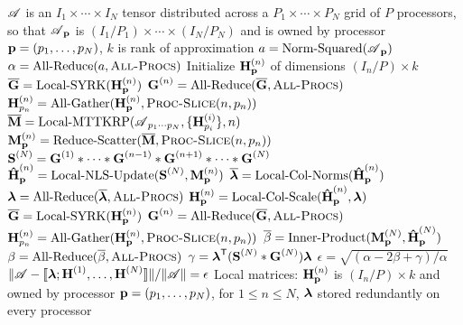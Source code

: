 \begin{algorithm}
\caption{$(\CPl,\epsilon) = \text{Par-NNCP}(\TA,k)$}
\label{alg:2D}
\begin{algorithmic}[1]
\Require $\TA$ is an $I_1\times \cdots \times I_N$ tensor distributed across a $P_1\times \cdots \times P_N$ grid of $P$ processors, so that $\TA_{\V{p}}$ is $(I_1/P_1)\times \cdots \times (I_N/P_N)$ and is owned by processor $\V{p}=(p_1,\dots,p_N)$, $k$ is rank of approximation
\State {}
\State $a = \text{Norm-Squared}(\TA_{\V{p}})$
\State $\alpha = \text{All-Reduce}(a,\textsc{All-Procs})$
	\State Initialize $\Mn{H}{n}_{\V{p}}$ of dimensions $(I_n/P)\times k$ 
	\State $\M[\overline]{G} = \text{Local-SYRK}(\Mn{H}{n}_{\V{p}})$
	\State $\Mn{G}{n} = \text{All-Reduce}(\M[\overline]{G},\textsc{All-Procs})$
	\State $\Mn{H}{n}_{p_n} = \text{All-Gather}(\Mn{H}{n}_{\V{p}},\textsc{Proc-Slice}(n,\VE{p}{n}))$
\EndFor
\State {}
	\State {}
	\State {}
	\State $\M[\overline]{M} = \text{Local-MTTKRP}(\TA_{p_1\cdots p_N},\{\Mn{H}{i}_{p_i}\},n)$
		\label{line:locMTTKRP}
	\State $\Mn{M}{n}_{\V{p}} = \text{Reduce-Scatter}(\M[\overline]{M},\textsc{Proc-Slice}(n,\VE{p}{n}))$ 
		\label{line:reduce-scatter}
	\State $\Mn{S}{N} = \Mn{G}{1} \Hada \cdots \Hada \Mn{G}{n-1} \Hada \Mn{G}{n+1} \Hada \cdots \Hada \Mn{G}{N}$
		\label{line:hadamard}
	\State $\Mn[\hat]{H}{n}_{\V{p}} = \text{Local-NLS-Update}(\Mn{S}{N},\Mn{M}{n}_{\V{p}})$
		\label{line:locNLS}
	\State {}
	\State $\V[\overline]{\lambda} = \text{Local-Col-Norms}(\Mn[\hat]{H}{n}_{\V{p}})$
	\State $\V{\lambda} = \text{All-Reduce}(\V[\overline]{\lambda},\textsc{All-Procs})$
	\State $\Mn{H}{n}_{\V{p}} = \text{Local-Col-Scale}(\Mn[\hat]{H}{n}_{\V{p}},\V{\lambda})$
	\State {}
	\State $\M[\overline]{G} = \text{Local-SYRK}(\Mn{H}{n}_{\V{p}})$
		\label{line:locSYRK}
	\State $\Mn{G}{n} = \text{All-Reduce}(\M[\overline]{G},\textsc{All-Procs})$
		\label{line:all-reduce}
	\State $\Mn{H}{n}_{p_n} = \text{All-Gather}(\Mn{H}{n}_{\V{p}},\textsc{Proc-Slice}(n,\VE{p}{n}))$
		\label{line:all-gather}
	\EndFor
	\State {}
	\State $\overline{\beta} = \text{Inner-Product}(\Mn{M}{N}_{\V{p}},\Mn[\hat]{H}{N}_{\V{p}})$
	\State $\beta = \text{All-Reduce}(\overline{\beta},\textsc{All-Procs})$
	\State $\gamma = \V{\lambda}^\Tra (\Mn{S}{N} \Hada \Mn{G}{N}) \V{\lambda}$
	\State $\epsilon = \sqrt{(\alpha-2\beta+\gamma)/\alpha}$ 
\EndWhile
\Ensure $\|\TA - \dsquare{\V{\lambda}; \Mn{H}{1},\dots,\Mn{H}{N}}\| /\|\TA\| = \epsilon$
\Ensure Local matrices: $\Mn{H}{n}_{\V{p}}$ is $(I_n/P)\times k$ and owned by processor $\V{p}=(p_1,\dots,p_N)$, for $1\leq n \leq N$, $\V{\lambda}$ stored redundantly on every processor
\end{algorithmic}
\end{algorithm}